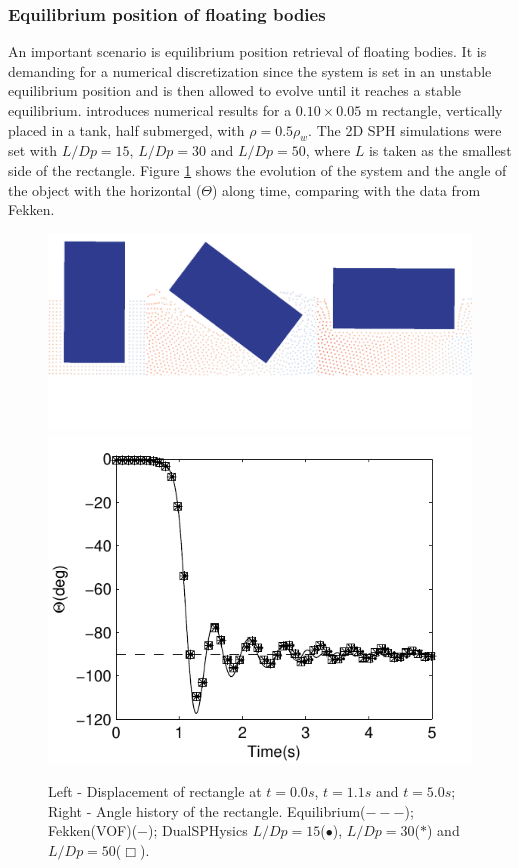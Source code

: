 \subsubsection{Equilibrium position of floating bodies}
\label{subSubsect:equilibrium}

An important scenario is equilibrium position retrieval of floating bodies. It is demanding for a numerical discretization since the system is set in an unstable equilibrium position and is then allowed to evolve until it reaches a stable equilibrium. \cite{Fekken-2004} introduces numerical results for a $0.10\times0.05$ m rectangle, vertically placed in a tank, half submerged, with $\rho=0.5\rho_{w}$. The 2D \ac{SPH} simulations were set with $L/Dp=15$, $L/Dp=30$ and $L/Dp=50$, where $L$ is taken as the smallest side of the rectangle. Figure \ref{fig:349_1_equl} shows the evolution of the system and the angle of the object with the horizontal ($\Theta$) along time, comparing with the data from Fekken. 
%
\begin{figure}[ht!]
	\centering
	\includegraphics[width=0.50\linewidth]{Figures/5.Chapter/fig19} 
	\includegraphics[width=0.49\linewidth]{Figures/5.Chapter/fig20a}
	\caption{Left - Displacement of rectangle at $t=0.0s$, $t=1.1s$ and $t=5.0s$; Right - Angle history of the rectangle. Equilibrium($---$); Fekken(\ac{VOF})\cite{Fekken-2004}($-$); DualSPHysics $L/Dp=15$($\bullet$), $L/Dp=30$($\ast$) and $L/Dp=50$($\Box$).}
	\label{fig:349_1_equl} 
\end{figure}
%

